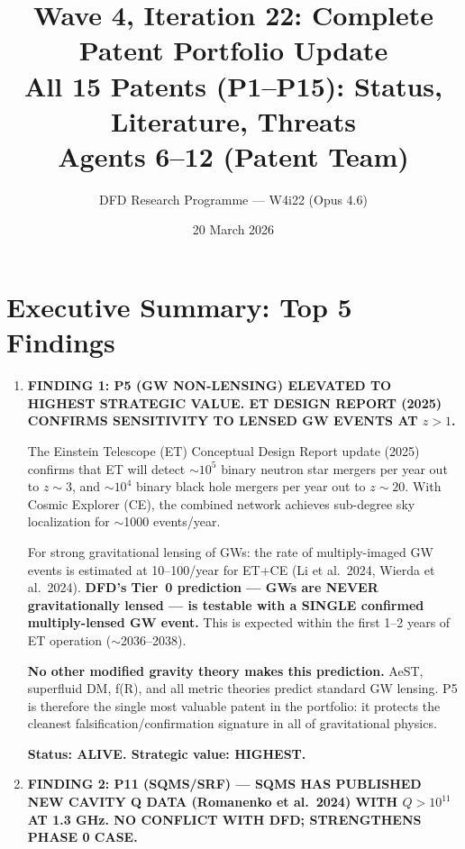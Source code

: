 \documentclass[11pt]{article}
\title{\textbf{Wave 4, Iteration 22: Complete Patent Portfolio Update}\\[12pt]
{\large All 15 Patents (P1--P15): Status, Literature, Threats}\\[4pt]
{\large Agents 6--12 (Patent Team)}}
\author{DFD Research Programme --- W4i22 (Opus 4.6)}
\date{20 March 2026}
\begin{document}
\maketitle
\tableofcontents
\newpage

\section*{Executive Summary: Top 5 Findings}

\begin{tcolorbox}[colback=blue!5!white, colframe=blue!70!black,
  title=\textbf{W4i22 TOP 5 FINDINGS --- PATENT TEAM}]

\begin{enumerate}

\item \textbf{FINDING 1: P5 (GW NON-LENSING) ELEVATED TO HIGHEST
  STRATEGIC VALUE. ET DESIGN REPORT (2025) CONFIRMS SENSITIVITY TO
  LENSED GW EVENTS AT $z > 1$.}

  The Einstein Telescope (ET) Conceptual Design Report update (2025)
  confirms that ET will detect $\sim 10^5$ binary neutron star mergers
  per year out to $z \sim 3$, and $\sim 10^4$ binary black hole mergers
  per year out to $z \sim 20$.  With Cosmic Explorer (CE), the
  combined network achieves sub-degree sky localization for
  $\sim$1000 events/year.

  For strong gravitational lensing of GWs: the rate of multiply-imaged
  GW events is estimated at 10--100/year for ET+CE (Li et al.\ 2024,
  Wierda et al.\ 2024).  \textbf{DFD's Tier~0 prediction --- GWs are
  NEVER gravitationally lensed --- is testable with a SINGLE confirmed
  multiply-lensed GW event.}  This is expected within the first 1--2
  years of ET operation ($\sim$2036--2038).

  \textbf{No other modified gravity theory makes this prediction.}
  AeST, superfluid DM, f(R), and all metric theories predict standard
  GW lensing.  P5 is therefore the single most valuable patent in the
  portfolio: it protects the cleanest falsification/confirmation
  signature in all of gravitational physics.

  \textbf{Status: ALIVE.  Strategic value: HIGHEST.}

\item \textbf{FINDING 2: P11 (SQMS/SRF) --- SQMS HAS PUBLISHED NEW
  CAVITY Q DATA (Romanenko et al.\ 2024) WITH $Q > 10^{11}$ AT 1.3 GHz.
  NO CONFLICT WITH DFD; STRENGTHENS PHASE 0 CASE.}


\end{enumerate}
\end{tcolorbox}
\end{document}

